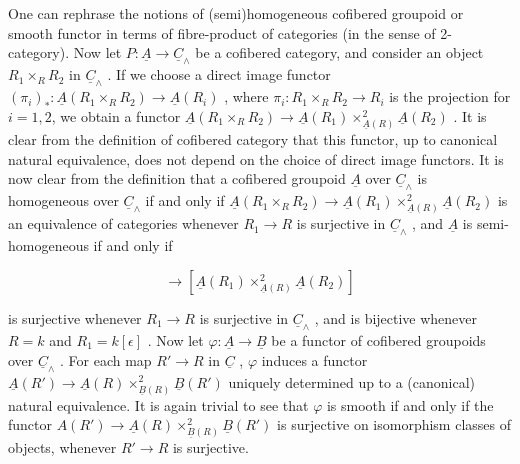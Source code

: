 \begin{center}
\end{center}
One can rephrase the notions of (semi)homogeneous cofibered groupoid or smooth functor in terms of fibre-product of categories (in the sense of 2-category). Now let  $P : \underline{A} \to \underline{C}_\wedge$  be a cofibered category, and consider an object $R_1 \times_R R_2$  in  $\underline{C}_\wedge$ . If we choose a direct image functor  $(\pi_i)_*: \underline{A}(R_1 \times_R R_2) \to \underline{A}(R_i)$ , where  $\pi_i : R_1 \times_R R_2 \to R_i$  is the projection for  $i = 1,2$,  we obtain a functor $\underline{A}(R_1 \times_R R_2) \to \underline{A}(R_1) \times^2_{\underline{A}(R)} \underline{A}(R_2)$ . It is clear from the definition of cofibered category that this functor, up to canonical natural equivalence, does not depend on the choice of direct image functors. It is now clear from the definition that a cofibered groupoid  $\underline{A}$  over  $\underline{C}_\wedge$  is homogeneous over  $\underline{C}_\wedge$  if and only if $\underline{A}(R_1 \times_R R_2) \to \underline{A}(R_1) \times^2_{\underline{A}(R)} \underline{A}(R_2)$  is an equivalence of categories whenever  $R_1 \to R$  is surjective in  $\underline{C}_\wedge$ , and  $\underline{A}$  is semi-homogeneous if and only if

\begin{equation*}
[\underline{A}(R \times_R R_2)] \longrightarrow [\underline{A}(R_1) \times^2_{\underline{A}(R)} \underline{A}(R_2)] 
\end{equation*}


 is surjective whenever  $R_1 \longrightarrow R$  is surjective in  $\underline{C}_\wedge$ , and is bijective whenever  $R = k$  and  $R_1 = k[\epsilon]$ . Now let  $\varphi : \underline{A} \to \underline{B}$  be a functor of cofibered groupoids over  $\underline{C}_\wedge$ . For each map  $R' \to R$  in  $\underline{C}$  , $\varphi$  induces a functor $\underline{A}(R') \to \underline{A}(R) \times^2_{\underline{B}(R)} \underline{B}(R')$  uniquely determined up to a (canonical) natural equivalence. It is again trivial to see that  $\varphi$  is smooth if and only if the functor $A(R') \to \underline{A}(R) \times^2_{\underline{B}(R)} \underline{B}(R')$  is surjective on isomorphism classes of objects, whenever $R' \to R$  is surjective.


